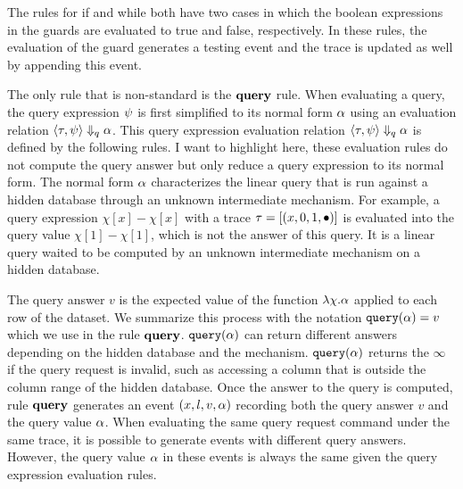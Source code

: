 The rules for if and while both have two cases 
in which the boolean expressions in the guards are evaluated to true and false, respectively. 
In these rules, the evaluation of the guard generates a testing event and the trace is updated as well by appending this event.

The only rule that is non-standard is the $\rname{query}$ rule. When evaluating a query, the query expression $\psi$ is first simplified to its normal form $\alpha$ using an evaluation relation 
$\langle \mathtt{\tau}, \psi \rangle \Downarrow_q \alpha$. 
This query expression evaluation relation $\langle \mathtt{\tau}, \psi \rangle \Downarrow_q \alpha$ is defined by the following rules.
I want to highlight here, these evaluation rules do not compute the query answer but only reduce a query expression to its normal form.
The normal form $\alpha$ characterizes the linear query that is run against a hidden database through an unknown intermediate mechanism.
For example, a query expression $\chi[x] - \chi[x]$ with a trace $\mathtt{\tau} = [(x, 0, 1, \bullet)]$
is evaluated into the query value $\chi[1] - \chi[1]$, which is not the answer of this query.
It is a linear query waited to be computed by an unknown intermediate mechanism on a hidden database.
{\small
{}
 }

The query answer $v$ is the expected value of the function $\lambda \chi.\alpha$ applied to each row of the dataset. 
We summarize this process with the notation ${\tt query}(\alpha) = v$ which we use in the rule $\rname{query}$. 
${\tt query}(\alpha) $ can return different answers depending on the hidden database and the mechanism.
${\tt query}(\alpha)$ returns the $\infty$ if the query request is invalid, such as accessing a column that is outside the column range of the hidden database.
Once the answer to the query is computed, rule $\rname{query}$ generates an event
$(x, l, v, \alpha)$ recording
both the query answer $v$ and the query value $\alpha$.
When evaluating the same query request command under the same trace, it is possible to generate
events with different query answers. However, the query value $\alpha$ in these events is always the same
given the query expression evaluation rules.

